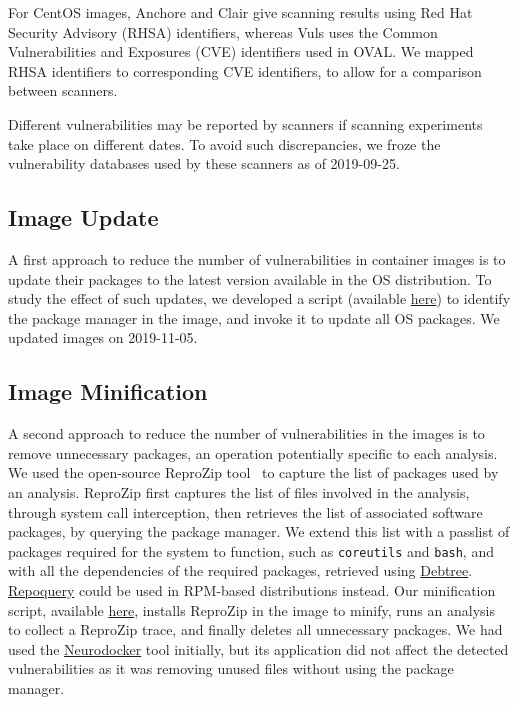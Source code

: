 \documentclass[a4paper,num-refs]{oup-contemporary}
\newcommand{\change}[2]{\color{cyan}Changes: #1\color{black}}
\newcommand{\reprozip}[0]{ReproZip\xspace}
\newcommand{\tristan}[1]{\color{red}From Tristan: #1\color{black}}
\begin{document}
For CentOS images, Anchore and Clair give scanning results using Red Hat
Security Advisory (RHSA) identifiers, whereas Vuls uses the Common
Vulnerabilities and Exposures (CVE) identifiers used in OVAL. We mapped
RHSA identifiers to corresponding CVE identifiers, to allow for a
comparison between scanners.

Different vulnerabilities may be reported by scanners if scanning
experiments take place on different dates. To avoid such discrepancies, we
froze the vulnerability databases used by these scanners as of 2019-09-25.

\subsection{Image Update}

A first approach to reduce the number of vulnerabilities in container
images is to update their packages to the latest version available in the OS
distribution. To study the effect of such updates, we developed a script
(available
\href{https://github.com/big-data-lab-team/container-vulnerabilities-paper/blob/master/Scripts/update}{here})
to identify the package manager in the image, and invoke it to update all
OS packages. We updated images on 2019-11-05.

\subsection{Image Minification}

A second approach to reduce the number of vulnerabilities in the images is
to remove unnecessary packages, an operation potentially specific to each
analysis. We used the open-source \reprozip tool~\cite{rampin2016reprozip}
to capture the list of packages used by an analysis. \reprozip first
captures the list of files involved in the analysis, through system call
interception, then retrieves the list of associated software packages, by
querying the package manager. We extend this list with a passlist of
packages required for the system to function, such as \texttt{coreutils}
and \texttt{bash}, and with all the dependencies of the required packages,
retrieved using
\href{http://manpages.ubuntu.com/manpages/xenial/man1/debtree.1.html}{Debtree}.
\href{https://linux.die.net/man/1/repoquery}{Repoquery} could be used in
RPM-based distributions instead. Our minification script, available
\href{https://github.com/big-data-lab-team/container-vulnerabilities-paper/tree/master/Scripts/minification}{here},
installs \reprozip in the image to minify, runs an analysis to collect a
\reprozip trace, and finally deletes all unnecessary packages. We had used
the \href{https://github.com/ReproNim/neurodocker}{Neurodocker} tool
initially, but its application did not affect the detected vulnerabilities
as it was removing unused files without using the package manager.
\end{document}
